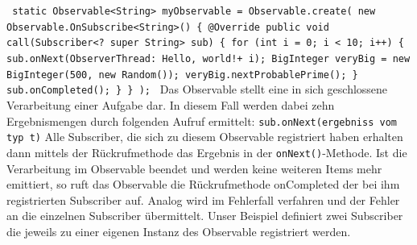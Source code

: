 \documentclass[12pt,oneside,a4paper,bibtotoc,liststotoc]{scrreprt}
\begin{document}
\texttt{\newline
static Observable<String> myObservable = Observable.create(\newline
           new Observable.OnSubscribe<String>() \{\newline
               @Override\newline
               public void call(Subscriber<? super String> sub) \{\newline
                   for (int i = 0; i < 10; i++)\newline
      \{\newline
                       sub.onNext(\grqq ObserverThread: Hello, world!\grqq + i);\newline
                       BigInteger veryBig = new BigInteger(500, new Random());\newline
                       veryBig.nextProbablePrime();\newline
                   \}\newline
                   sub.onCompleted();\newline
               \}\newline
           \}\newline
   );\newline
}\newline
Das Observable stellt eine in sich geschlossene Verarbeitung einer Aufgabe dar. In diesem Fall werden dabei zehn Ergebnismengen durch folgenden Aufruf ermittelt:\newline\newline
\texttt{sub.onNext(ergebniss vom typ t)}\newline
\newline
Alle Subscriber, die sich zu diesem Observable registriert haben erhalten dann mittels der Rückrufmethode das Ergebnis in der \texttt{onNext()}-Methode. Ist die Verarbeitung im Observable beendet und werden keine weiteren Items mehr emittiert, so ruft das Observable die Rückrufmethode onCompleted der bei ihm registrierten Subscriber auf. Analog wird im Fehlerfall verfahren und der Fehler an die einzelnen Subscriber übermittelt. Unser Beispiel definiert zwei Subscriber die jeweils zu einer eigenen Instanz des Observable registriert werden.\newline \newline\newline\newline\newline
\end{document}
